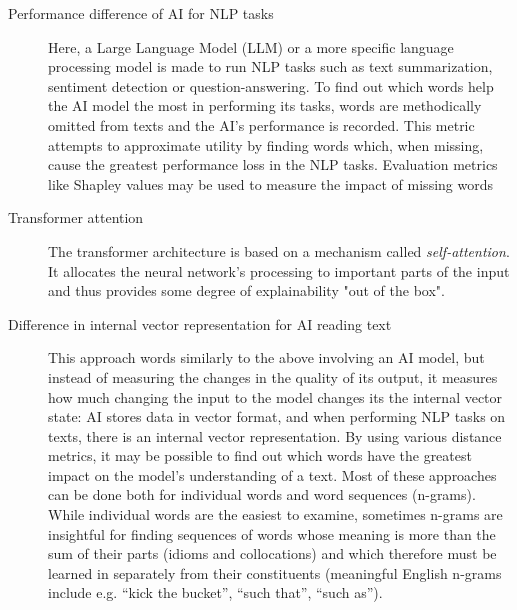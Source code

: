 \begin{description}
	\item [Performance difference of AI for NLP tasks]
	      Here, a Large Language Model (LLM) or a more specific language processing model is made to run NLP tasks such as text summarization, sentiment detection or question-answering.
	      To find out which words help the AI model the most in performing its tasks, words are methodically omitted from texts and the AI’s performance is recorded.
	      This metric attempts to approximate utility by finding words which, when missing, cause the greatest performance loss in the NLP tasks.
	      Evaluation metrics like Shapley values \cite{wangShapleyExplanationNetworks2021} may be used to measure the impact of missing words
	\item [Transformer attention]
	      The transformer architecture is based on a mechanism called \textit{self-attention}.
	      It allocates the neural network's processing to important parts of the input and thus provides some degree of explainability "out of the box".

	\item [Difference in internal vector representation for AI reading text]
	      This approach words similarly to the above involving an AI model, but instead of measuring the changes in the quality of its output, it measures how much changing the input to the model changes its the internal vector state: AI stores data in vector format, and when performing NLP tasks on texts, there is an internal vector representation.
	      By using various distance metrics, it may be possible to find out which words have the greatest impact on the model’s understanding of a text.
	      Most of these approaches can be done both for individual words and word sequences (n-grams).
	      While individual words are the easiest to examine, sometimes n-grams are insightful for finding sequences of words whose meaning is more than the sum of their parts (idioms and collocations) and which therefore must be learned in separately from their constituents (meaningful English n-grams include e.g. “kick the bucket”, “such that”, “such as”).


\end{description}
